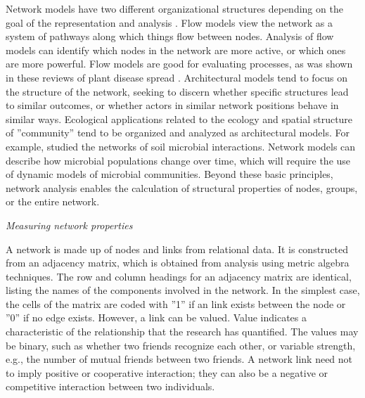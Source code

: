 Network models have two different organizational structures depending on the goal of the representation and analysis . Flow models view the network as a system of pathways along which things flow between nodes. Analysis of flow models can identify which nodes in the network are more active, or which ones are more powerful. Flow models are good for evaluating processes, as was shown in these reviews of plant disease spread . Architectural models tend to focus on the structure of the network, seeking to discern whether specific structures lead to similar outcomes, or whether actors in similar network positions behave in similar ways. Ecological applications related to the ecology and spatial structure of ''community'' tend to be organized and analyzed as architectural models. For example,  studied the networks of soil microbial interactions. Network models can describe how microbial populations change over time, which will require the use of dynamic models of microbial communities. Beyond these basic principles, network analysis enables the calculation of structural properties of nodes, groups, or the entire network.

\textit{Measuring network properties}


A network is made up of nodes and links from relational data. It is constructed from an adjacency matrix, which is obtained from analysis using metric algebra techniques. The row and column headings for an adjacency matrix are identical, listing the names of the components involved in the network. In the simplest case, the cells of the matrix are coded with ''1'' if an link exists between the node or ''0'' if no edge exists. However, a link can be valued. Value indicates a characteristic of the relationship that the research has quantified. The values may be binary, such as whether two friends recognize each other, or variable strength, e.g., the number of mutual friends between two friends. A network link need not to imply positive or cooperative interaction; they can also be a negative or competitive interaction between two individuals.    


